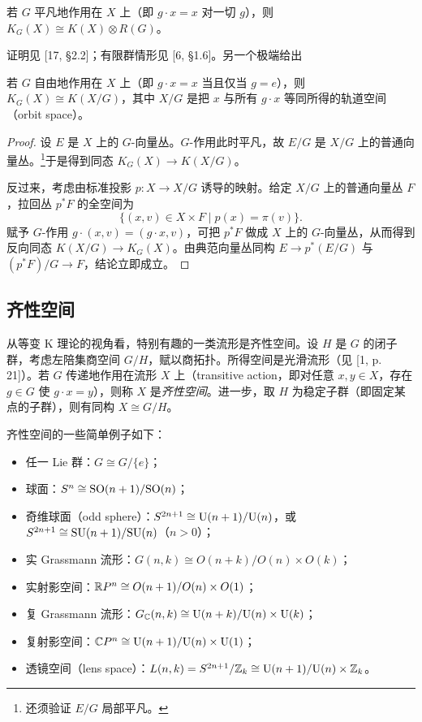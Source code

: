 \begin{proposition}
若 $G$ 平凡地作用在 $X$ 上（即 $g\cdot x=x$ 对一切 $g$），则 $K_G(X)\cong K(X)\otimes R(G)$。
\end{proposition}

证明见 [17, §2.2]；有限群情形见 [6, §1.6]。另一个极端给出

\begin{proposition}
若 $G$ 自由地作用在 $X$ 上（即 $g\cdot x=x$ 当且仅当 $g=e$），则 $K_G(X)\cong K(X/G)$，其中 $X/G$ 是把 $x$ 与所有 $g\cdot x$ 等同所得的轨道空间（orbit space）。
\end{proposition}

\begin{proof}
设 $E$ 是 $X$ 上的 $G$-向量丛。$G$-作用此时平凡，故 $E/G$ 是 $X/G$ 上的普通向量丛。\footnote{还须验证 $E/G$ 局部平凡。}于是得到同态 $K_G(X)\to K(X/G)$。

反过来，考虑由标准投影 $p:X\to X/G$ 诱导的映射。给定 $X/G$ 上的普通向量丛 $F$，拉回丛 $p^*F$ 的全空间为
\[
\{(x,v)\in X\times F\mid p(x)=\pi(v)\}.
\]
赋予 $G$-作用 $g\cdot(x,v)=(g\cdot x,v)$，可把 $p^*F$ 做成 $X$ 上的 $G$-向量丛，从而得到反向同态 $K(X/G)\to K_G(X)$。由典范向量丛同构 $E\to p^*(E/G)$ 与 $(p^*F)/G\to F$，结论立即成立。
\end{proof}


\subsection{齐性空间}

从等变 K 理论的视角看，特别有趣的一类流形是齐性空间。设 $H$ 是 $G$ 的闭子群，考虑左陪集商空间 $G/H$，赋以商拓扑。所得空间是光滑流形（见 [1, p. 21]）。若 $G$ 传递地作用在流形 $X$ 上（transitive action，即对任意 $x,y\in X$，存在 $g\in G$ 使 $g\cdot x=y$），则称 $X$ 是\emph{齐性空间}。进一步，取 $H$ 为稳定子群（即固定某点的子群），则有同构 $X\cong G/H$。

齐性空间的一些简单例子如下：
\begin{itemize}[leftmargin=1.6em]
\item 任一 Lie 群：$G\cong G/\{e\}$；
\item 球面：$S^n\cong\mathrm{SO}(n+1)/\mathrm{SO}(n)$；
\item 奇维球面（odd sphere）：$S^{2n+1}\cong\mathrm{U}(n+1)/\mathrm{U}(n)$，或 $S^{2n+1}\cong\mathrm{SU}(n+1)/\mathrm{SU}(n)$（$n>0$）；
\item 实 Grassmann 流形：$G(n,k)\cong O(n+k)/O(n)\times O(k)$；
\item 实射影空间：$\mathbb{R} P^n\cong O(n+1)/O(n)\times O(1)$；
\item 复 Grassmann 流形：$G_{\mathbb{C}}(n,k)\cong\mathrm{U}(n+k)/\mathrm{U}(n)\times\mathrm{U}(k)$；
\item 复射影空间：$\mathbb{C} P^n\cong\mathrm{U}(n+1)/\mathrm{U}(n)\times\mathrm{U}(1)$；
\item 透镜空间（lens space）：$L(n,k)=S^{2n+1}/\mathbb{Z}_k\cong\mathrm{U}(n+1)/\mathrm{U}(n)\times\mathbb{Z}_k$。
\end{itemize}

